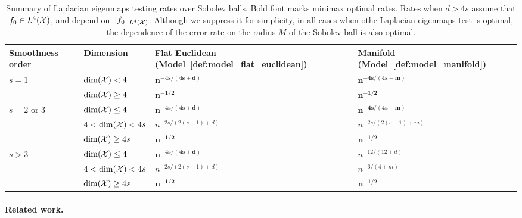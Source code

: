 \begin{table}
	\begin{center}
		\begin{tabular}{p{} p{} | p{} p{} }
			Smoothness order & Dimension & Flat Euclidean (Model~\ref{def:model_flat_euclidean}) & Manifold (Model~\ref{def:model_manifold}) \\
			\hline
			\multirow{2}{*}{$s = 1$} & $\dim(\mathcal{X}) < 4$ & $\bm{n^{-4s/(4s + d)}}$ & $\bm{n^{-4s/(4s + m)}}$ \\
			& $\dim(\mathcal{X}) \geq 4$ & $\bm{n^{-1/2}}$ & $\bm{n^{-1/2}}$ \\
			\hline
			\multirow{3}{*}{$s = 2$ or $3$} & $\dim(\mathcal{X}) \leq 4$  & $\bm{n^{-4s/(4s + d)}}$ & $\bm{n^{-4s/(4s + m)}}$ \\
			& $4 <\dim(\mathcal{X}) < 4s$  & $n^{-2s/(2(s - 1) + d)}$ & $n^{-2s/(2(s - 1) + m)}$\\
			& $\dim(\mathcal{X}) \geq 4s$ & $\bm{n^{-1/2}}$ & $\bm{n^{-1/2}}$ \\
			\hline
			\multirow{3}{*}{$s > 3$} & $\dim(\mathcal{X}) \leq 4$ & $\bm{n^{-4s/(4s + d)}}$ & $n^{-12/(12 + d)}$ \\
			& $4 < \dim(\mathcal{X}) < 4s$ & $n^{-2s/(2(s - 1) + d)}$ & $n^{-6/(4 + m)}$ \\
			& $\dim(\mathcal{X}) \geq 4s$ & $\bm{n^{-1/2}}$ & $\bm{n^{-1/2}}$ \\
		\end{tabular}
	\end{center}
	\caption{Summary of Laplacian eigenmaps testing rates over Sobolev balls. Bold font marks minimax optimal rates. Rates when $d > 4s$ assume that $f_0 \in L^4(\mathcal{X})$, and depend on $\|f_0\|_{L^4(\mathcal{X})}$. Although we suppress it for simplicity, in all cases when othe Laplacian eigenmaps test is optimal, the dependence of the error rate on the radius $M$ of the Sobolev ball is also optimal.}
	\label{tbl:testing_rates}
\end{table}

\paragraph{Related work.}

